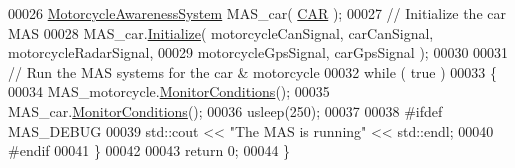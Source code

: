 \begin{DoxyCode}
00026     \hyperlink{classMotorcycleAwarenessSystem}{MotorcycleAwarenessSystem} MAS\_car( \hyperlink{MotorcycleAwarenessSystemTypes_8hpp_a0c05c42b98a847f971385c81c2a81afaa5fc54ebcb1dd4bf1e1b93cbc77b57b40}{CAR} );
00027     \textcolor{comment}{// Initialize the car MAS}
00028     MAS\_car.\hyperlink{classMotorcycleAwarenessSystem_a55f1ea16b6311120ea42b460fb8b3a71}{Initialize}( motorcycleCanSignal, carCanSignal, motorcycleRadarSignal,
00029                                           motorcycleGpsSignal, carGpsSignal );
00030 
00031     \textcolor{comment}{// Run the MAS systems for the car & motorcycle}
00032     \textcolor{keywordflow}{while} ( \textcolor{keyword}{true} )
00033     \{
00034         MAS\_motorcycle.\hyperlink{classMotorcycleAwarenessSystem_afb19e832c17d43941d9ed6c4f4435a2e}{MonitorConditions}();
00035         MAS\_car.\hyperlink{classMotorcycleAwarenessSystem_afb19e832c17d43941d9ed6c4f4435a2e}{MonitorConditions}();
00036         usleep(250);
00037 
00038 \textcolor{preprocessor}{#ifdef MAS\_DEBUG}
00039 \textcolor{preprocessor}{}        std::cout << \textcolor{stringliteral}{"The MAS is running"} << std::endl;
00040 \textcolor{preprocessor}{#endif}
00041 \textcolor{preprocessor}{}    \}
00042 
00043     \textcolor{keywordflow}{return} 0;
00044 \}
\end{DoxyCode}
